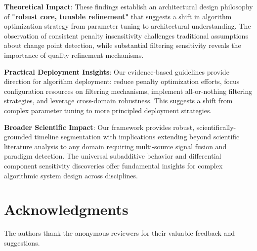 \documentclass[conference]{IEEEtran}
\begin{document}
\textbf{Theoretical Impact}:
These findings establish an architectural design philosophy of \textbf{"robust core, tunable refinement"} that suggests a shift in algorithm optimization strategy from parameter tuning to architectural understanding. The observation of consistent penalty insensitivity challenges traditional assumptions about change point detection, while substantial filtering sensitivity reveals the importance of quality refinement mechanisms.

\textbf{Practical Deployment Insights}:
Our evidence-based guidelines provide direction for algorithm deployment: reduce penalty optimization efforts, focus configuration resources on filtering mechanisms, implement all-or-nothing filtering strategies, and leverage cross-domain robustness. This suggests a shift from complex parameter tuning to more principled deployment strategies.

\textbf{Broader Scientific Impact}:
Our framework provides robust, scientifically-grounded timeline segmentation with implications extending beyond scientific literature analysis to any domain requiring multi-source signal fusion and paradigm detection. The universal subadditive behavior and differential component sensitivity discoveries offer fundamental insights for complex algorithmic system design across disciplines.

\section*{Acknowledgments}
The authors thank the anonymous reviewers for their valuable feedback and suggestions.
\end{document}
